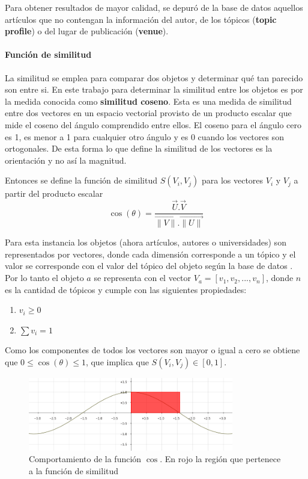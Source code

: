 Para obtener resultados de mayor calidad, se depuró de la base de datos aquellos artículos que no contengan la información del autor, de los tópicos (\textbf{topic profile}) o del lugar de publicación (\textbf{venue}). 

\paragraph{Función de similitud}
La similitud se emplea para comparar dos objetos y determinar qué tan parecido son entre si. En este trabajo para determinar la similitud entre los objetos es por la medida conocida como \textbf{similitud coseno}. Esta es una medida de similitud entre dos vectores en un espacio vectorial provisto de un producto escalar que mide el coseno del ángulo comprendido entre ellos. El coseno para el ángulo cero es 1, es menor a 1 para cualquier otro ángulo y es 0 cuando los vectores son ortogonales. De esta forma lo que define la similitud de los vectores es la orientación y no así la magnitud.

Entonces se define la función de similitud $S(V_i, V_j)$ para los vectores $V_i$ y $V_j$ a partir del producto escalar\\

\begin{equation} \label{eq:angulovectorial}
\cos(\theta) =  \dfrac{\overrightarrow{U} . \overrightarrow{V}}{\overrightarrow{\lVert V\lVert}.\overrightarrow{\lVert U\lVert}}
\end{equation}

Para esta instancia los objetos (ahora artículos, autores o universidades) son representados por vectores, donde cada dimensión corresponde a un tópico y el valor se corresponde con el valor del tópico del objeto según la base de datos \cite{dataDrive}. Por lo tanto el objeto $a$ se representa con el vector $V_a = [v_1,v_2,...,v_n]$, donde $n$ es la cantidad de tópicos y cumple con las siguientes propiedades:
\begin{enumerate}
 \item $v_i \geq 0$
 \item $\sum{v_i} = 1$
\end{enumerate}

Como los componentes de todos los vectores son mayor o igual a cero se obtiene que $0\leq\cos(\theta)\leq1$, que implica que $S(V_i, V_j) \in \left[0, 1\right]$.

\begin{figure}[H]
\includegraphics[width=0.8\textwidth]{img/coseno.png}
\caption{Comportamiento de la función $\cos$. En rojo la región que pertenece a la función de similitud}
\label{bus:img-coseno}
\end{figure}

